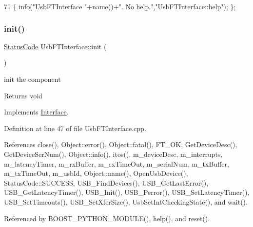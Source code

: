 \begin{DoxyCode}
71 \{ \hyperlink{classObject_a644fd329ea4cb85f54fa6846484b84a8}{info}(\textcolor{stringliteral}{"UsbFTInterface "}+\hyperlink{classObject_a300f4c05dd468c7bb8b3c968868443c1}{name}()+\textcolor{stringliteral}{". No help."},\textcolor{stringliteral}{"UsbFTInterface::help"}); \};
\end{DoxyCode}
\mbox{\label{classUsbFTInterface_a5371fe7b447850599eaec81a0ffa2ba0}} 
\subsubsection{\texorpdfstring{init()}{init()}}
{\footnotesize\ttfamily \hyperlink{classStatusCode}{Status\+Code} Usb\+F\+T\+Interface\+::init (\begin{DoxyParamCaption}{ }\end{DoxyParamCaption})\hspace{0.3cm}{\ttfamily [virtual]}}

init the component

\begin{DoxyReturn}{Returns}
void 
\end{DoxyReturn}


Implements \hyperlink{classInterface_a1d095c113b1e89d1f5f68323856fee63}{Interface}.



Definition at line 47 of file Usb\+F\+T\+Interface.\+cpp.



References close(), Object\+::error(), Object\+::fatal(), F\+T\+\_\+\+OK, Get\+Device\+Desc(), Get\+Device\+Ser\+Num(), Object\+::info(), itos(), m\+\_\+device\+Desc, m\+\_\+interrupts, m\+\_\+latency\+Timer, m\+\_\+rx\+Buffer, m\+\_\+rx\+Time\+Out, m\+\_\+serial\+Num, m\+\_\+tx\+Buffer, m\+\_\+tx\+Time\+Out, m\+\_\+usb\+Id, Object\+::name(), Open\+Usb\+Device(), Status\+Code\+::\+S\+U\+C\+C\+E\+SS, U\+S\+B\+\_\+\+Find\+Devices(), U\+S\+B\+\_\+\+Get\+Last\+Error(), U\+S\+B\+\_\+\+Get\+Latency\+Timer(), U\+S\+B\+\_\+\+Init(), U\+S\+B\+\_\+\+Perror(), U\+S\+B\+\_\+\+Set\+Latency\+Timer(), U\+S\+B\+\_\+\+Set\+Timeouts(), U\+S\+B\+\_\+\+Set\+Xfer\+Size(), Usb\+Set\+Int\+Checking\+State(), and wait().



Referenced by B\+O\+O\+S\+T\+\_\+\+P\+Y\+T\+H\+O\+N\+\_\+\+M\+O\+D\+U\+L\+E(), help(), and reset().


